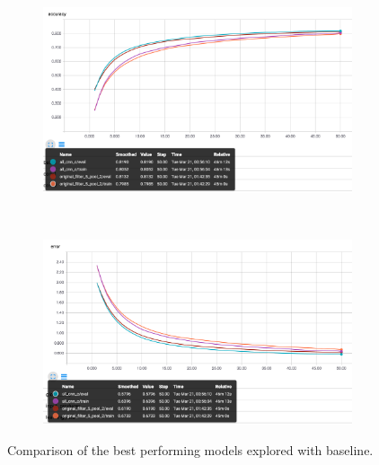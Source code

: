 \documentclass[12pt]{article}
\begin{document}
\begin{figure}[ht!]
    \centering
    \begin{subfigure}[t]{0.475\textwidth}
        \centering
        \includegraphics[width=1.0\linewidth]{disalla.png}
    \end{subfigure}%
    ~ 
    \begin{subfigure}[t]{0.475\textwidth}
        \centering
        \includegraphics[width=1.0\linewidth]{disalle.png}
    \end{subfigure}
    \caption{Comparison of the best performing models explored with baseline.}
    \label{fig:rescomp}
\end{figure}
\end{document}
